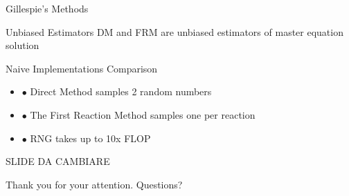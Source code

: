 \documentclass{beamer}
\begin{document}
\begin{frame}{Gillespie's Methods}
  \begin{block}{Unbiased Estimators}
    DM and FRM are unbiased estimators of
    master equation solution

  \end{block}
  \begin{block}{Naive Implementations Comparison}
    \begin{itemize} 
    \item $\bullet$ Direct Method samples 2 random numbers
    \item $\bullet$ The First Reaction Method samples one per reaction 
    \item $\bullet$ RNG takes up to 10x FLOP
    \end{itemize}
  \end{block}
\center \Huge{SLIDE DA CAMBIARE}
\end{frame}

\begin{frame}
  \begin{center}
    \Huge{Thank you for your attention.}
    \Huge{Questions?}
  \end{center}
\end{frame}
\end{document}
